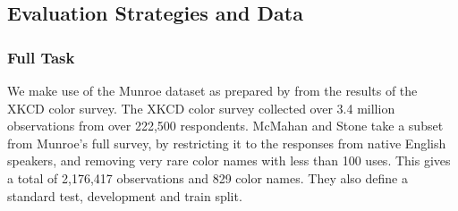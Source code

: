 \subsection{Evaluation Strategies and Data}


\subsubsection{Full Task}\label{sec:full-task}
We make use of the  Munroe dataset as prepared by \textcite{mcmahan2015bayesian} from the results of the XKCD color survey.
The XKCD color survey \parencite{Munroe2010XKCDdataset} collected over 3.4 million observations from over 222,500 respondents.
McMahan and Stone take a subset from Munroe's full survey, by restricting it to the responses from native English speakers, 
and removing very rare color names with less than 100 uses.
This gives a total of 2,176,417 observations and 829 color names. 
They also define a standard test, development and train split.

